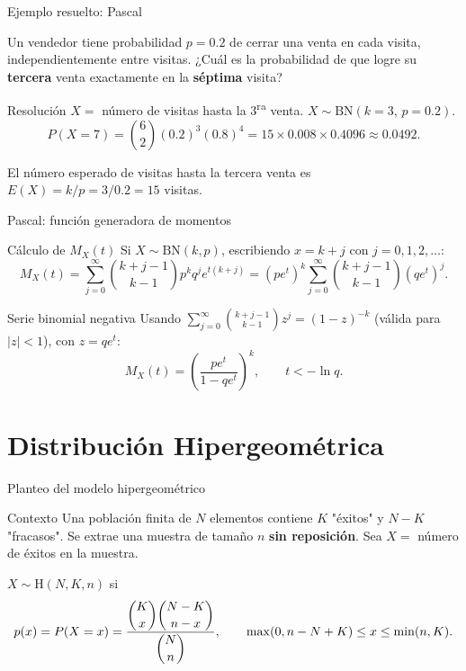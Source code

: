 \documentclass[aspectratio=169,11pt]{beamer}
\begin{document}
\begin{frame}{Ejemplo resuelto: Pascal}
\begin{example}
Un vendedor tiene probabilidad $p=0.2$ de cerrar una venta en cada visita, independientemente entre visitas. ¿Cuál es la probabilidad de que logre su \textbf{tercera} venta exactamente en la \textbf{séptima} visita?
\end{example}

\begin{block}{Resolución}
$X=$ número de visitas hasta la 3\textsuperscript{ra} venta. $X\sim\text{BN}(k=3,\,p=0.2)$.
$$P(X=7) = \binom{6}{2}(0.2)^3(0.8)^4 = 15 \times 0.008 \times 0.4096 \approx 0.0492.$$

El número esperado de visitas hasta la tercera venta es $E(X) = k/p = 3/0.2 = 15$ visitas.
\end{block}
\end{frame}

\begin{frame}{Pascal: función generadora de momentos}
\begin{block}{Cálculo de $M_X(t)$}
Si $X\sim\text{BN}(k,p)$, escribiendo $x=k+j$ con $j=0,1,2,\dots$:
$$M_X(t) = \sum_{j=0}^\infty \binom{k+j-1}{k-1}p^kq^j e^{t(k+j)} = (pe^t)^k\sum_{j=0}^\infty\binom{k+j-1}{k-1}(qe^t)^j.$$
\end{block}

\begin{alertblock}{Serie binomial negativa}
Usando $\displaystyle\sum_{j=0}^\infty\binom{k+j-1}{k-1}z^j = (1-z)^{-k}$ (válida para $|z|<1$), con $z=qe^t$:
$$M_X(t) = \left(\frac{pe^t}{1-qe^t}\right)^k, \qquad t < -\ln q.$$
\end{alertblock}
\end{frame}

\section{Distribución Hipergeométrica}

\begin{frame}{Planteo del modelo hipergeométrico}
\begin{block}{Contexto}
Una población finita de $N$ elementos contiene $K$ "éxitos" y $N-K$ "fracasos". Se extrae una muestra de tamaño $n$ \textbf{sin reposición}. Sea $X=$ número de éxitos en la muestra.
\end{block}

\begin{definition}
$X\sim\text{H}(N,K,n)$ si
$$p(x) = P(X=x) = \frac{\dbinom{K}{x}\dbinom{N-K}{n-x}}{\dbinom{N}{n}}, \qquad \max(0,n-N+K)\le x \le \min(n,K).$$
\end{definition}
\end{frame}
\end{document}
